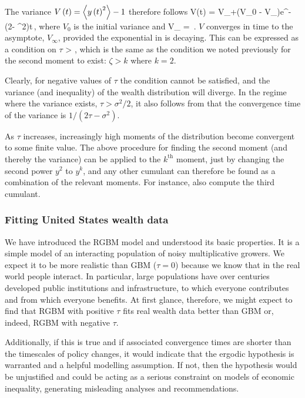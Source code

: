 The variance $V\left(t\right)=\left\langle y\left(t\right)^2 \right\rangle-1$ therefore follows
\be
V\left(t\right) = V_{\infty}+\left(V_0 - V_{\infty}\right)e^{-\left(2\tau - \sigma^2\right)t}\,,
\ee
where $V_0$ is the initial variance and
\be
V_{\infty} = \,.
\ee
$V$ converges in time to the asymptote, $V_{\infty}$, provided the exponential in  is decaying. 
This can be expressed as a condition on $\tau$
\be
\tau > ,
\ee
which is the same as the condition we noted previously for the second moment to exist: $\zeta>k$ where $k=2$.

Clearly, for negative values of $\tau$ the condition cannot be satisfied, and the variance (and inequality) of the wealth distribution will diverge. In the regime where the variance exists, $\tau > \sigma^2/2$, it also follows from  that the convergence time of the variance is $1/\left(2\tau - \sigma^2\right)$.

As $\tau$ increases, increasingly high moments of the distribution become convergent to some finite value. The above procedure for finding the second moment (and thereby the variance) can be applied to the $k^\text{th}$ moment, just by changing the second power $y^2$ to $y^k$, and any other cumulant can therefore be found as a combination of the relevant moments. For instance, \cite{LiuSerota2016} also compute the third cumulant.


\subsubsection{Fitting United States wealth data}
We have introduced the RGBM model and understood its basic properties. It is a simple model of an interacting population of noisy multiplicative growers. We expect it to be more realistic than GBM ($\tau=0$) because we know that in the real world people interact. In particular, large populations have over centuries developed public institutions and infrastructure, to which everyone contributes and from which everyone benefits. At first glance, therefore, we might expect to find that RGBM with positive $\tau$ fits real wealth data better than GBM or, indeed, RGBM with negative $\tau$.

Additionally, if this is true and if associated convergence times are shorter than the timescales of policy changes, it would indicate that the ergodic hypothesis is warranted and a helpful modelling assumption. If not, then the hypothesis would be unjustified and could be acting as a serious constraint on models of economic inequality, generating misleading analyses and recommendations.

